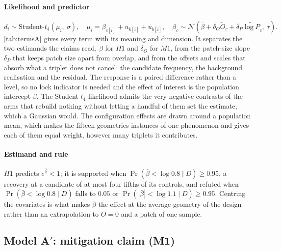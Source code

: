 \paragraph{Likelihood and predictor}
\begin{equation}
\label{eq:appA:model}
d_i \sim \text{Student-}t_4(\mu_i,\ \sigma),
\quad
\mu_i = \beta_{c[i]} + u_{k[i]} + u_{b[i]},
\quad
\beta_c \sim \mathcal{N}\!\left(\bar\beta + \delta_O \widetilde O_c + \delta_P \widetilde{\log P}_c,\ \tau\right).
\end{equation}
\autoref{tab:termsA} gives every term with its meaning and dimension. It separates the two estimands the claims read, $\bar\beta$ for $H1$ and $\delta_O$ for $M1$, from the patch-size slope $\delta_P$ that keeps patch size apart from overlap, and from the offsets and scales that absorb what a triplet does not cancel: the candidate frequency, the background realisation and the residual. The response is a paired difference rather than a level, so no lock indicator is needed and the effect of interest is the population intercept $\bar\beta$. The Student-$t_4$ likelihood admits the very negative contrasts of the arms that rebuild nothing without letting a handful of them set the estimate, which a Gaussian would. The configuration effects are drawn around a population mean, which makes the fifteen geometries instances of one phenomenon and gives each of them equal weight, however many triplets it contributes.



\paragraph{Estimand and rule} $H1$ predicts $e^{\bar\beta}<1$; it is supported when $\Pr(\bar\beta<\log 0.8\mid D)\ge0.95$, a recovery at a candidate of at most four fifths of its controls, and refuted when $\Pr(\bar\beta<\log 0.8\mid D)$ falls to $0.05$ or $\Pr(|\bar\beta|<\log1.1\mid D)\ge0.95$. Centring the covariates is what makes $\bar\beta$ the effect at the average geometry of the design rather than an extrapolation to $O=0$ and a patch of one sample.

\subsection{\texorpdfstring{Model A$'$}{Model A'}: mitigation claim (M1)}

